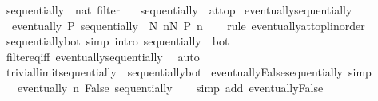 \begin{isabellebody}
{\isafolddocument}%
%
\isadelimdocument
%
\endisadelimdocument
{}\isamarkupfalse%
\ sequentially\ {\isacharcolon}{\kern0pt}{\isacharcolon}{\kern0pt}\ {\isachardoublequoteopen}nat\ filter{\isachardoublequoteclose}\isanewline
\ \ \ {\isachardoublequoteopen}sequentially\ {\isasymequiv}\ at{\isacharunderscore}{\kern0pt}top{\isachardoublequoteclose}\isanewline
\isanewline
{}\isamarkupfalse%
\ eventually{\isacharunderscore}{\kern0pt}sequentially{\isacharcolon}{\kern0pt}\isanewline
\ \ {\isachardoublequoteopen}eventually\ P\ sequentially\ {\isasymlongleftrightarrow}\ {\isacharparenleft}{\kern0pt}{\isasymexists}N{\isachardot}{\kern0pt}\ {\isasymforall}n{\isasymge}N{\isachardot}{\kern0pt}\ P\ n{\isacharparenright}{\kern0pt}{\isachardoublequoteclose}\isanewline
%
\isadelimproof
\ \ %
\endisadelimproof
%
\isatagproof
{}\isamarkupfalse%
\ {\isacharparenleft}{\kern0pt}rule\ eventually{\isacharunderscore}{\kern0pt}at{\isacharunderscore}{\kern0pt}top{\isacharunderscore}{\kern0pt}linorder{\isacharparenright}{\kern0pt}%
\endisatagproof
{\isafoldproof}%
%
\isadelimproof
\isanewline
%
\endisadelimproof
\isanewline
{}\isamarkupfalse%
\ sequentially{\isacharunderscore}{\kern0pt}bot\ {\isacharbrackleft}{\kern0pt}simp{\isacharcomma}{\kern0pt}\ intro{\isacharbrackright}{\kern0pt}{\isacharcolon}{\kern0pt}\ {\isachardoublequoteopen}sequentially\ {\isasymnoteq}\ bot{\isachardoublequoteclose}\isanewline
%
\isadelimproof
\ \ %
\endisadelimproof
%
\isatagproof
{}\isamarkupfalse%
\ filter{\isacharunderscore}{\kern0pt}eq{\isacharunderscore}{\kern0pt}iff\ eventually{\isacharunderscore}{\kern0pt}sequentially\ \isamarkupfalse%
\ auto%
\endisatagproof
{\isafoldproof}%
%
\isadelimproof
\isanewline
%
\endisadelimproof
\isanewline
{}\isamarkupfalse%
\ trivial{\isacharunderscore}{\kern0pt}limit{\isacharunderscore}{\kern0pt}sequentially\ {\isacharequal}{\kern0pt}\ sequentially{\isacharunderscore}{\kern0pt}bot\isanewline
\isanewline
{}\isamarkupfalse%
\ eventually{\isacharunderscore}{\kern0pt}False{\isacharunderscore}{\kern0pt}sequentially\ {\isacharbrackleft}{\kern0pt}simp{\isacharbrackright}{\kern0pt}{\isacharcolon}{\kern0pt}\isanewline
\ \ {\isachardoublequoteopen}{\isasymnot}\ eventually\ {\isacharparenleft}{\kern0pt}{\isasymlambda}n{\isachardot}{\kern0pt}\ False{\isacharparenright}{\kern0pt}\ sequentially{\isachardoublequoteclose}\isanewline
%
\isadelimproof
\ \ %
\endisadelimproof
%
\isatagproof
{}\isamarkupfalse%
\ {\isacharparenleft}{\kern0pt}simp\ add{\isacharcolon}{\kern0pt}\ eventually{\isacharunderscore}{\kern0pt}False{\isacharparenright}{\kern0pt}%

\end{isabellebody}
